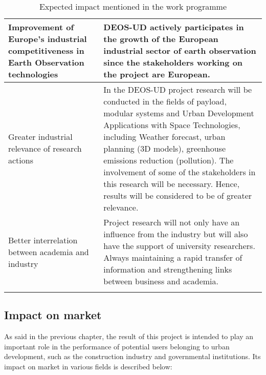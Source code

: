 \begin{longtable}{>{\raggedright\arraybackslash}p{3cm} p{11cm}}
	\midrule
	
	Improvement of Europe’s industrial competitiveness in Earth Observation technologies & DEOS-UD actively participates in the growth of the European industrial sector of earth observation since the stakeholders working on the project are European.\vspace{0.2cm}\\
	
	\midrule
	
	Greater industrial relevance of research actions & In the DEOS-UD project research will be conducted in the fields of payload, modular systems and Urban Development Applications with Space Technologies, including Weather forecast, urban planning (3D models), greenhouse emissions reduction (pollution). The involvement of some of the stakeholders in this research will be necessary. Hence, results will be considered to be of greater relevance.\vspace{0.2cm}\\
	
	\midrule
	
	Better interrelation between academia and industry & Project research will not only have an influence from the industry but will also have the support of university researchers. Always maintaining a rapid transfer of information and strengthening links between business and academia.\vspace{0.2cm}\\
	
	\bottomrule[2pt]
	
	\caption{Expected impact mentioned in the work programme}
\end{longtable}

\pagebreak

\subsection{Impact on market}

As said in the previous chapter, the result of this project is intended to play an important role in the performance of potential users belonging to urban development, such as the construction industry and governmental institutions. Its impact on market in various fields is described below:

